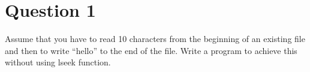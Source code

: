 \documentclass[main.tex]{subfiles}
\begin{document}
\section{Question 1}
Assume that you have to read 10 characters from the beginning of an existing
file and then to write “hello” to the end of the file. Write a program to
achieve this without using lseek function.




\end{document}
